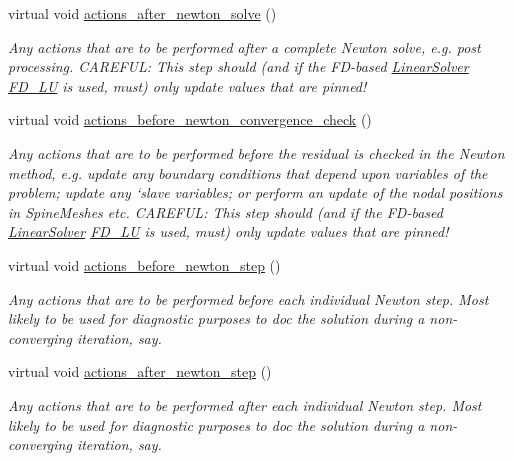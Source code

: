 \begin{DoxyCompactItemize}
virtual void \hyperlink{classoomph_1_1Problem_a033ec7301123deeb7e56d04c38f9f1da}{actions\+\_\+after\+\_\+newton\+\_\+solve} ()
\begin{DoxyCompactList}\small\item\em Any actions that are to be performed after a complete Newton solve, e.\+g. post processing. C\+A\+R\+E\+F\+UL\+: This step should (and if the F\+D-\/based \hyperlink{classoomph_1_1LinearSolver}{Linear\+Solver} \hyperlink{classoomph_1_1FD__LU}{F\+D\+\_\+\+LU} is used, must) only update values that are pinned! \end{DoxyCompactList}\item 
virtual void \hyperlink{classoomph_1_1Problem_ae6ad96ddf5d48b517b89c9a9b879bc4b}{actions\+\_\+before\+\_\+newton\+\_\+convergence\+\_\+check} ()
\begin{DoxyCompactList}\small\item\em Any actions that are to be performed before the residual is checked in the Newton method, e.\+g. update any boundary conditions that depend upon variables of the problem; update any `slave\textquotesingle{} variables; or perform an update of the nodal positions in Spine\+Meshes etc. C\+A\+R\+E\+F\+UL\+: This step should (and if the F\+D-\/based \hyperlink{classoomph_1_1LinearSolver}{Linear\+Solver} \hyperlink{classoomph_1_1FD__LU}{F\+D\+\_\+\+LU} is used, must) only update values that are pinned! \end{DoxyCompactList}\item 
virtual void \hyperlink{classoomph_1_1Problem_a07fc81781c74b25c8a426ec18295b0d0}{actions\+\_\+before\+\_\+newton\+\_\+step} ()
\begin{DoxyCompactList}\small\item\em Any actions that are to be performed before each individual Newton step. Most likely to be used for diagnostic purposes to doc the solution during a non-\/converging iteration, say. \end{DoxyCompactList}\item 
virtual void \hyperlink{classoomph_1_1Problem_aed8bc6e7b0bb45b86d5b44737b554d50}{actions\+\_\+after\+\_\+newton\+\_\+step} ()
\begin{DoxyCompactList}\small\item\em Any actions that are to be performed after each individual Newton step. Most likely to be used for diagnostic purposes to doc the solution during a non-\/converging iteration, say. \end{DoxyCompactList}\item 

\end{DoxyCompactItemize}
